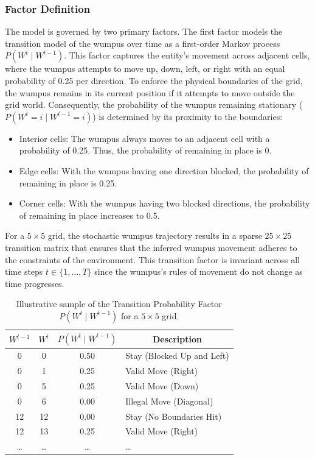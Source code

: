 \documentclass[10pt]{article}
\begin{document}
\subsubsection{Factor Definition}
The model is governed by two primary factors. The first factor models the transition model of the wumpus over time as a first-order Markov process $P(W^t \mid W^{t-1})$. 
This factor captures the entity's movement across adjacent cells, where the wumpus attempts to move up, down, left, or right with an equal probability of 0.25 per direction. 
To enforce the physical boundaries of the grid, the wumpus remains in its current position if it attempts to move outside the grid world. Consequently, 
the probability of the wumpus remaining stationary ($P(W^t = i \mid W^{t-1} = i)$) is determined by its proximity to the boundaries:
\begin{itemize}
  \item Interior cells: The wumpus always moves to an adjacent cell with a probability of 0.25. Thus, the probability of remaining in place is 0.
  \item Edge cells: With the wumpus having one direction blocked, the probability of remaining in place is 0.25.
  \item Corner cells: With the wumpus having two blocked directions, the probability of remaining in place increases to 0.5.
\end{itemize}

For a $5 \times 5$ grid, the stochastic wumpus trajectory results in a sparse $25 \times 25$ transition matrix that ensures that the inferred wumpus movement 
adheres to the constraints of the environment. This transition factor is invariant across all time steps $t \in \{1, \dots, T\}$ since the wumpus's rules of movement 
do not change as time progresses.

\begin{table}[h]
\centering
\caption{Illustrative sample of the Transition Probability Factor $P(W^t \mid W^{t-1})$ for a $5 \times 5$ grid.}
\label{tab:transition_factor}
\begin{tabular}{|c|c|c|l|}
\hline
$W^{t-1}$ & $W^t$ & $P(W^t \mid W^{t-1})$ & \multicolumn{1}{c|}{\textbf{Description}} \\ \hline
0         & 0     & 0.50                 & Stay (Blocked Up and Left) \\ \hline
0         & 1     & 0.25                 & Valid Move (Right)         \\ \hline
0         & 5     & 0.25                 & Valid Move (Down)          \\ \hline
0         & 6     & 0.00                 & Illegal Move (Diagonal)    \\ \hline
12        & 12    & 0.00                 & Stay (No Boundaries Hit)   \\ \hline
12        & 13    & 0.25                 & Valid Move (Right)         \\ \hline
\dots     & \dots & \dots                & \dots                      \\ \hline
\end{tabular}
\end{table}
\end{document}
